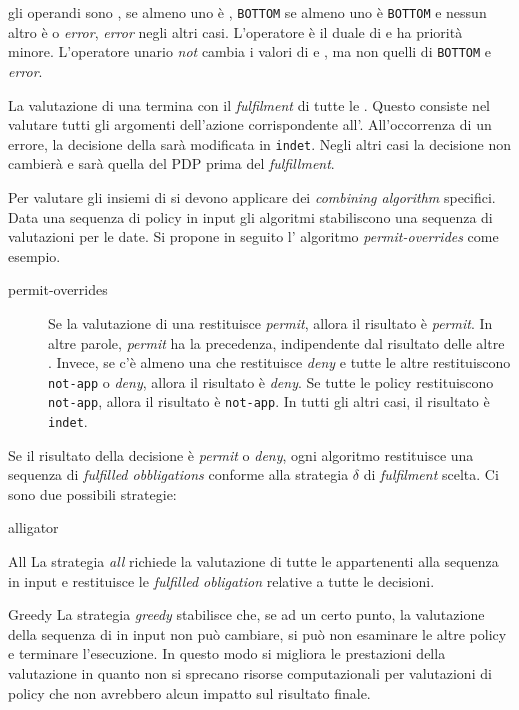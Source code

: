 gli operandi sono \etrue, \efalse se almeno uno è \efalse, \texttt{BOTTOM} se almeno uno è \texttt{BOTTOM} e nessun altro è
\efalse o \emph{error}, \emph{error} negli altri casi. L'operatore \eor è il duale di \eand e ha priorità minore.
L'operatore unario \emph{not} cambia i valori di \etrue e \efalse, ma non quelli di \texttt{BOTTOM} e \emph{error}.\par
La valutazione di una \epolicy termina con il \emph{fulfilment} di tutte le \eObligations. Questo consiste nel valutare
tutti gli argomenti dell'azione corrispondente all'\eobligation. All'occorrenza di un errore, la decisione della \epolicy
sarà modificata in \texttt{indet}.
Negli altri casi la decisione non cambierà e sarà quella del PDP prima del \emph{fulfillment}.\par
Per valutare gli insiemi di \epolicy si devono applicare dei \emph{combining algorithm} specifici. Data una sequenza di
policy in input gli algoritmi stabiliscono una sequenza di valutazioni per le \epolicy date. Si propone in seguito l' algoritmo
\emph{permit-overrides} come esempio.
\begin{description}
\item[permit-overrides]Se la valutazione di una \epolicy restituisce \emph{permit}, allora il risultato è \emph{permit}.
                        In altre parole, \emph{permit} ha la precedenza, indipendente dal risultato delle altre \epolicy.
                        Invece, se c'è almeno una \epolicy che restituisce \emph{deny} e tutte le altre restituiscono
                        \texttt{not-app} o \emph{deny}, allora il risultato è \emph{deny}. Se tutte le policy restituiscono
                        \texttt{not-app}, allora il risultato è \texttt{not-app}. In tutti gli altri casi, il risultato è \texttt{indet}.
\end{description}
Se il risultato della decisione è \emph{permit} o \emph{deny}, ogni algoritmo restituisce una sequenza di \emph{fulfilled obbligations}
conforme alla strategia $\delta$ di \emph{fulfilment} scelta. Ci sono due possibili strategie:
\begin{labeling}{alligator}
  \item[All]La strategia \emph{all} richiede la valutazione di tutte le \epolicy appartenenti alla sequenza in input e
            restituisce le \emph{fulfilled obligation} relative a tutte le decisioni.
  \item[Greedy]La strategia \emph{greedy} stabilisce che, se ad un certo punto, la valutazione della sequenza di \epolicy
               in input non può cambiare, si può non esaminare le altre policy e terminare l'esecuzione. In questo modo
               si migliora le prestazioni della valutazione in quanto non si sprecano risorse computazionali
               per valutazioni di policy che non avrebbero alcun impatto sul risultato finale.
\end{labeling}\par
